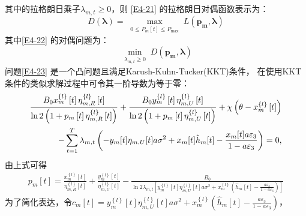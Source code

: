 其中的拉格朗日乘子$\lambda_{m,t}\geq 0$，则 \eqref{E4-21} 的拉格朗日对偶函数表示为：
\begin{equation} \label{E4-22}
D(\mathbf{\lambda})=\max _{\substack{0 \leq P_m[t] \leq P_{\max }}} L\left(\mathbf{p_m},\mathbf{\lambda}\right)
\end{equation}
其中\eqref{E4-22} 的对偶问题为：
\begin{equation} \label{E4-23}
\min_{\substack{\lambda_{m,t}\geq 0}} D\left(\mathbf{p_m},\mathbf{\lambda}\right)
\end{equation}
问题\eqref{E4-23} 是一个凸问题且满足Karush-Kuhn-Tucker(KKT)条件，
在使用KKT条件的类似求解过程中可令其一阶导数为等于零：
\begin{align}\label{E4-24}
\frac{{{B}_{0}}x_{m}^{\left\{ l \right\}}\left[ t \right]\eta _{m,R}^{\left\{ l \right\}}\left[ t \right]}{\ln 2\left( 1+{{p}_{m}}\left[ t \right]\eta _{m,R}^{\left\{ l \right\}}\left[ t \right] \right)}+\frac{{{B}_{0}}y_{m}^{\left\{ l \right\}}\left[ t \right]\eta _{m,U}^{\left\{ l \right\}}\left[ t \right]}{\ln 2\left( 1+{{p}_{m}}\left[ t \right]\eta _{m,U}^{\left\{ l \right\}}\left[ t \right] \right)}+\chi \left( \theta -x_{m}^{\left\{ l \right\}}\left[ t \right] \right) \\   \notag
-\sum\limits_{t=1}^{T}{{{\lambda }_{m,t}}}\left( -{{y}_{m}}[t]{{\eta }_{m,U}}[t]a{{\sigma }^{2}}+{{x}_{m}}[t]{{{\hat{h}}}\phantom{}_{m}}[t]-\frac{{{x}_{m}}[t]a{{\varepsilon }_{3}}}{1-a{{\varepsilon }_{3}}} \right)=0,
\end{align}
由上式可得
\begin{align}\label{E4-25}
\!\!\!\!{{p}_{m}}\left[ t \right]=\frac{x_{m}^{\left\{ l \right\}}\left[ t \right]}{\eta _{m,R}^{\left\{ l \right\}}\left[ t \right]}+\frac{y_{m}^{\left\{ l \right\}}\left[ t \right]}{\eta _{m,U}^{\left\{ l \right\}}\left[ t \right]}-\frac{{{B}_{0}}}{\ln 2{{\lambda }_{m,t}}\left[ y_{m}^{\left\{ l \right\}}\left[ t \right]\eta _{m,U}^{\left\{ l \right\}}\left[ t \right]a{{\sigma }^{2}}+x_{m}^{\left\{ l \right\}}\left( {{{\hat{h}}}\phantom{}_{m}}[t]-\frac{a{{\varepsilon }_{3}}}{1-a{{\varepsilon }_{3}}} \right) \right]}
\end{align}
为了简化表达，令${{c}_{m}}\left[ t \right]=y_{m}^{\left\{ l \right\}}\left[ t \right]\eta _{m,U}^{\left\{ l \right\}}\left[ t \right]a{{\sigma }^{2}}+x_{m}^{\left\{ l \right\}}\left( {{{\hat{h}}}\phantom{}_{m}}[t]-\frac{a{{\varepsilon }_{3}}}{1-a{{\varepsilon }_{3}}} \right)$，

